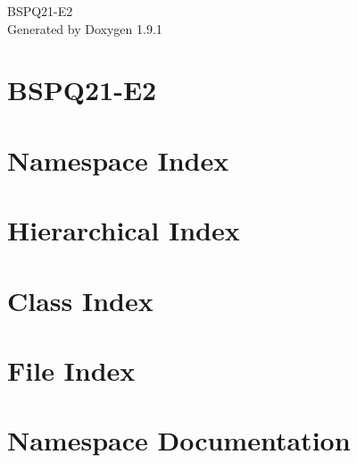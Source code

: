 \let\mypdfximage\pdfximage\def\pdfximage{\immediate\mypdfximage}\documentclass[twoside]{book}
\newcommand{\+}{\discretionary{\mbox{\scriptsize$\hookleftarrow$}}{}{}}
\newcommand{\clearemptydoublepage}{%
  \newpage{\pagestyle{empty}\cleardoublepage}%
}
\begin{document}
\raggedbottom

\hypersetup{pageanchor=false,
             bookmarksnumbered=true,
             pdfencoding=unicode
            }
\begin{titlepage}
\vspace*{7cm}
\begin{center}%
{\Large BSPQ21-\/\+E2 }\\
\vspace*{1cm}
{\large Generated by Doxygen 1.9.1}\\
\end{center}
\end{titlepage}
\clearemptydoublepage
{}
\tableofcontents
\clearemptydoublepage
{}
\hypersetup{pageanchor=true}

\chapter{BSPQ21-\/\+E2}
\label{md__r_e_a_d_m_e}

\chapter{Namespace Index}

\chapter{Hierarchical Index}

\chapter{Class Index}

\chapter{File Index}

\chapter{Namespace Documentation}







\end{document}
